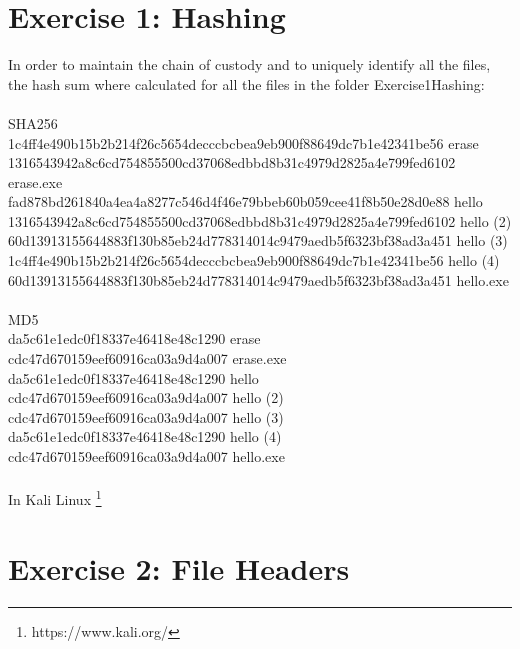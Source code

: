 \documentclass[a5paper,10pt,oneside]{article}
\begin{document}
\section{Exercise 1: Hashing}
In order to maintain the chain of custody and to uniquely identify all the files, the hash sum where calculated for all the files in the folder Exercise1\textunderscore Hashing:
\\
\\
SHA256\\
{\scriptsize 1c4ff4e490b15b2b214f26c5654decccbcbea9eb900f88649dc7b1e42341be56  erase\\
1316543942a8c6cd754855500cd37068edbbd8b31c4979d2825a4e799fed6102  erase.exe\\
fad878bd261840a4ea4a8277c546d4f46e79bbeb60b059cee41f8b50e28d0e88  hello\\
1316543942a8c6cd754855500cd37068edbbd8b31c4979d2825a4e799fed6102  hello (2)\\
60d13913155644883f130b85eb24d778314014c9479aedb5f6323bf38ad3a451  hello (3)\\
1c4ff4e490b15b2b214f26c5654decccbcbea9eb900f88649dc7b1e42341be56  hello (4)\\
60d13913155644883f130b85eb24d778314014c9479aedb5f6323bf38ad3a451  hello.exe\\}
\\
MD5\\
{\scriptsize da5c61e1edc0f18337e46418e48c1290  erase\\
cdc47d670159eef60916ca03a9d4a007  erase.exe\\
da5c61e1edc0f18337e46418e48c1290  hello\\
cdc47d670159eef60916ca03a9d4a007  hello (2)\\
cdc47d670159eef60916ca03a9d4a007  hello (3)\\
da5c61e1edc0f18337e46418e48c1290  hello (4)\\
cdc47d670159eef60916ca03a9d4a007  hello.exe\\}
\\
In Kali Linux \footnote{https://www.kali.org/}






\section{Exercise 2: File Headers}
\end{document}
